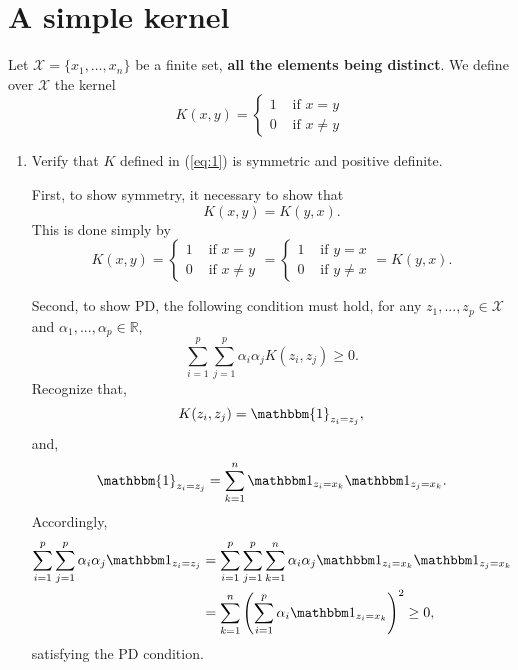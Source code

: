 \documentclass[12pt]{article}
\begin{document}
\newpage


\section{A simple kernel} 
Let $\mathcal{X}=\{x_1,\ldots,x_n\}$ be a finite set, {\bf all the elements being distinct}. 
We define over $\mathcal{X}$ the kernel 
\begin{equation}
\label{eq:1}
K(x,y) = \left\{ \begin{array}{cc}
1 & \mbox{ if } x=y\\
0 & \mbox{ if } x \not = y
\end{array}
\right.
\end{equation}
\begin{enumerate}
\item Verify that $K$ defined in (\ref{eq:1}) is symmetric and positive definite. 

First, to show symmetry, it necessary to show that
\begin{equation}
K(x, y) = K(y, x).
\end{equation}
This is done simply by
\begin{equation}
K(x, y) =  \left\{ \begin{array}{cc}
1 & \mbox{ if } x=y\\
0 & \mbox{ if } x \not = y
\end{array}
\right. 
= 
 \left\{ \begin{array}{cc}
1 & \mbox{ if } y=x\\
0 & \mbox{ if } y \not = x
\end{array}
\right.
= K(y, x).
\end{equation}


Second, to show PD, the following condition must hold, for any $z_1,...,z_p \in \mathcal X$ and $\alpha_1, ..., \alpha_p \in \mathbb  R$,
\begin{equation}
\sum_{i=1}^{p} \sum_{j=1}^{p} \alpha_i \alpha_j K(z_i, z_j) \ge 0.
\end{equation}
Recognize that,
\begin{equation}
K(z_i, z_j) = \mathbbm{1}_{z_i = z_j},
\end{equation}
and,
\begin{equation}
\mathbbm{1}_{z_i = z_j} = \sum_{k=1}^{n} \mathbbm 1_{z_i = x_k} \mathbbm 1_{z_j = x_k}.
\end{equation}
Accordingly,
\begin{equation}
\begin{aligned}
\sum_{i=1}^{p} \sum_{j=1}^{p} \alpha_{i} \alpha_{j} \mathbbm 1_{z_i = z_j} &= \sum_{i=1}^{p} \sum_{j=1}^{p} \sum_{k=1}^{n} \alpha_{i} \alpha_{j} \mathbbm 1_{z_i = x_k} \mathbbm 1_{z_j = x_k} \\
 &= \sum_{k=1}^{n} \left( \sum_{i=1}^{p} \alpha_i \mathbbm 1_{z_i=x_k} \right)^2 \ge 0,
\end{aligned}
\end{equation}
satisfying the PD condition.


\end{enumerate}
\end{document}

